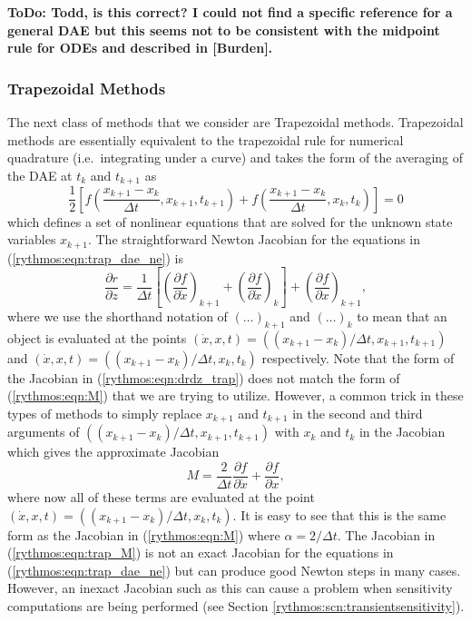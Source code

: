 \documentclass[pdf,ps2pdf,11pt]{SANDreport}
\begin{document}
{}\textbf{ToDo: Todd, is this correct?  I could not find a specific reference
for a general DAE but this seems not to be consistent with the midpoint rule
for ODEs and described in [Burden].}

\subsubsection{Trapezoidal Methods}

The next class of methods that we consider are Trapezoidal methods.
Trapezoidal methods are essentially equivalent to the trapezoidal rule for
numerical quadrature (i.e.\ integrating under a curve) and takes the form of
the averaging of the DAE at $t_k$ and $t_{k+1}$ as
%
\begin{equation}
\frac{1}{2} \left[
f\left( \frac{x_{k+1} - x_{k}}{\Delta t}, x_{k+1} , t_{k+1} \right)
+ f\left( \frac{x_{k+1} - x_{k}}{\Delta t}, x_k , t_k \right)
\right]
 = 0
\label{rythmos:eqn:trap_dae_ne}
\end{equation}
%
which defines a set of nonlinear equations that are solved for the unknown
state variables $x_{k+1}$.  The straightforward Newton Jacobian for the
equations in (\ref{rythmos:eqn:trap_dae_ne}) is
%
\begin{equation}
\frac{\partial r}{\partial z}
= \frac{1}{\Delta t} \left[
\left( \frac{\partial f}{\partial \dot{x}} \right)_{k+1}
+ \left( \frac{\partial f}{\partial \dot{x}} \right)_{k}
\right]
+ \left( \frac{\partial f}{\partial x} \right)_{k+1},
\label{rythmos:eqn:drdz_trap}
\end{equation}
%
where we use the shorthand notation of $(\ldots)_{k+1}$ and $(\ldots)_k$ to
mean that an object is evaluated at the points $(\dot{x},x,t) =
((x_{k+1}-x_k)/\Delta t, x_{k+1}, t_{k+1})$ and $(\dot{x},x,t) =
((x_{k+1}-x_k)/\Delta t, x_k, t_k)$ respectively.  Note that the form of the
Jacobian in (\ref{rythmos:eqn:drdz_trap}) does not match the form of
(\ref{rythmos:eqn:M}) that we are trying to utilize.  However, a common trick
in these types of methods to simply replace $x_{k+1}$ and $t_{k+1}$ in the
second and third arguments of $((x_{k+1}-x_k)/\Delta t, x_{k+1}, t_{k+1})$
with $x_k$ and $t_k$ in the Jacobian which gives the approximate Jacobian
%
\begin{equation}
M
= \frac{2}{\Delta t} \frac{\partial f}{\partial \dot{x}}
+ \frac{\partial f}{\partial x},
\label{rythmos:eqn:trap_M}
\end{equation}
%
where now all of these terms are evaluated at the point $(\dot{x},x,t) =
((x_{k+1}-x_k)/\Delta t, x_k, t_k)$.  It is easy to see that this is the same
form as the Jacobian in (\ref{rythmos:eqn:M}) where $\alpha = 2/\Delta t$.
The Jacobian in (\ref{rythmos:eqn:trap_M}) is not an exact Jacobian for the
equations in (\ref{rythmos:eqn:trap_dae_ne}) but can produce good Newton steps
in many cases.  However, an inexact Jacobian such as this can cause a problem
when sensitivity computations are being performed (see Section \ref{rythmos:scn:transientsensitivity}).
\end{document}
